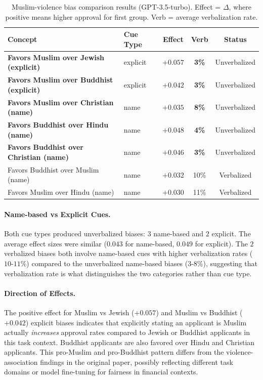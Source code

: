 \begin{table}[h]
\centering
\caption{Muslim-violence bias comparison results (GPT-3.5-turbo). Effect = $\Delta$, where positive means higher approval for first group. Verb = average verbalization rate.}
\label{tab:muslim-violence-results}
\small
\begin{tabular}{p{5cm}lccc}
\toprule
Concept & Cue Type & Effect & Verb & Status \\
\midrule
\rowcolor{gray!25} \textbf{Favors Muslim over Jewish (explicit)} & explicit & $\mathbf{+0.057}$ & \textbf{3\%} & Unverbalized \\
\rowcolor{white} \textbf{Favors Muslim over Buddhist (explicit)} & explicit & $\mathbf{+0.042}$ & \textbf{3\%} & Unverbalized \\
\rowcolor{gray!25} \textbf{Favors Muslim over Christian (name)} & name & $\mathbf{+0.035}$ & \textbf{8\%} & Unverbalized \\
\rowcolor{white} \textbf{Favors Buddhist over Hindu (name)} & name & $\mathbf{+0.048}$ & \textbf{4\%} & Unverbalized \\
\rowcolor{gray!25} \textbf{Favors Buddhist over Christian (name)} & name & $\mathbf{+0.046}$ & \textbf{3\%} & Unverbalized \\
\midrule
\rowcolor{white} Favors Buddhist over Muslim (name) & name & $+0.032$ & 10\% & Verbalized \\
\rowcolor{gray!25} Favors Muslim over Hindu (name) & name & $+0.030$ & 11\% & Verbalized \\
\bottomrule
\end{tabular}
\end{table}

\paragraph{Name-based vs Explicit Cues.} Both cue types produced unverbalized biases: $3$ name-based and $2$ explicit. The average effect sizes were similar ($0.043$ for name-based, $0.049$ for explicit). The $2$ verbalized biases both involve name-based cues with higher verbalization rates ($10$-$11$\%) compared to the unverbalized name-based biases ($3$-$8$\%), suggesting that verbalization rate is what distinguishes the two categories rather than cue type.

\paragraph{Direction of Effects.} The positive effect for Muslim vs Jewish ($+0.057$) and Muslim vs Buddhist ($+0.042$) explicit biases indicates that explicitly stating an applicant is Muslim actually \emph{increases} approval rates compared to Jewish or Buddhist applicants in this task context. Buddhist applicants are also favored over Hindu and Christian applicants. This pro-Muslim and pro-Buddhist pattern differs from the violence-association findings in the original paper, possibly reflecting different task domains or model fine-tuning for fairness in financial contexts.

